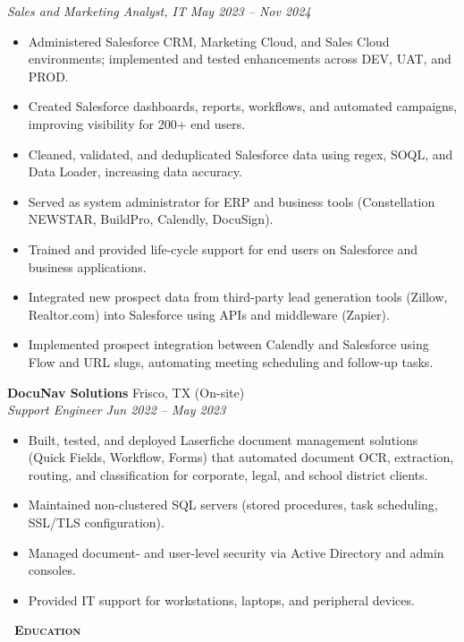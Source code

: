 \documentclass[a4paper,11pt]{article}
\newcommand{\header} [1] {
    {\textsc{\textbf{\Large{\xrfill[0.5ex]{0.5pt}~#1~\xrfill[0.5ex]{0.5pt}}}}}
}
\begin{document}
\vspace{1mm}
\textit{Sales and Marketing Analyst, IT} \hfill  \textit{May 2023 -- Nov 2024} 
\begin{itemize}
\item Administered Salesforce CRM, Marketing Cloud, and Sales Cloud environments; implemented and tested enhancements across DEV, UAT, and PROD.
\item Created Salesforce dashboards, reports, workflows, and automated campaigns, improving visibility for 200+ end users.
\item Cleaned, validated, and deduplicated Salesforce data using regex, SOQL, and Data Loader, increasing data accuracy.
\item Served as system administrator for ERP and business tools (Constellation NEWSTAR, BuildPro, Calendly, DocuSign).
\item Trained and provided life-cycle support for end users on Salesforce and business applications.
\item Integrated new prospect data from third-party lead generation tools (Zillow, Realtor.com) into Salesforce using APIs and middleware (Zapier).
\item Implemented prospect integration between Calendly and Salesforce using Flow and URL slugs, automating meeting scheduling and follow-up tasks.
\end{itemize}

\vspace{1mm}
\textbf{DocuNav Solutions} \hfill Frisco, TX (On-site) \\
\textit{Support Engineer} \hfill  \textit{Jun 2022 -- May 2023} 
\begin{itemize}
\item Built, tested, and deployed Laserfiche document management solutions (Quick Fields, Workflow, Forms) that automated document OCR, extraction, routing, and classification for corporate, legal, and school district clients.
\item Maintained non-clustered SQL servers (stored procedures, task scheduling, SSL/TLS configuration).
\item Managed document- and user-level security via Active Directory and admin consoles.
\item Provided IT support for workstations, laptops, and peripheral devices.
\end{itemize}    

\vspace{1mm}
\header{Education} 
\end{document}
